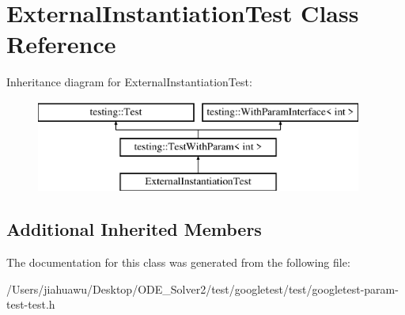 \hypertarget{class_external_instantiation_test}{}\section{External\+Instantiation\+Test Class Reference}
\label{class_external_instantiation_test}
Inheritance diagram for External\+Instantiation\+Test\+:\begin{figure}[H]
\begin{center}
\leavevmode
\includegraphics[height=3.000000cm]{class_external_instantiation_test}
\end{center}
\end{figure}
\subsection*{Additional Inherited Members}


The documentation for this class was generated from the following file\+:\begin{DoxyCompactItemize}
\item 
/\+Users/jiahuawu/\+Desktop/\+O\+D\+E\+\_\+\+Solver2/test/googletest/test/googletest-\/param-\/test-\/test.\+h\end{DoxyCompactItemize}
